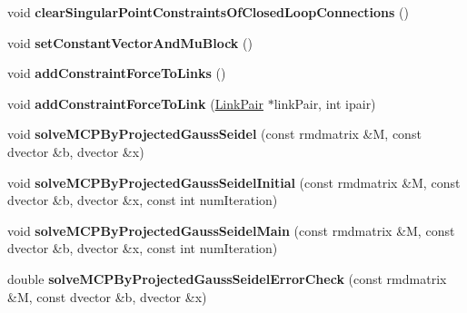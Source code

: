 \begin{DoxyCompactItemize}
\item 
\hypertarget{classOpenHRP_1_1CFSImpl_ab7dda78cbc91b0a1de4179ea4e67e830}{void {\bfseries clear\-Singular\-Point\-Constraints\-Of\-Closed\-Loop\-Connections} ()}\label{classOpenHRP_1_1CFSImpl_ab7dda78cbc91b0a1de4179ea4e67e830}

\item 
\hypertarget{classOpenHRP_1_1CFSImpl_abf1ed971249dd317097ed66dcae9b31d}{void {\bfseries set\-Constant\-Vector\-And\-Mu\-Block} ()}\label{classOpenHRP_1_1CFSImpl_abf1ed971249dd317097ed66dcae9b31d}

\item 
\hypertarget{classOpenHRP_1_1CFSImpl_af2ed56c8f5f0227f1e8afc58ac5743a7}{void {\bfseries add\-Constraint\-Force\-To\-Links} ()}\label{classOpenHRP_1_1CFSImpl_af2ed56c8f5f0227f1e8afc58ac5743a7}

\item 
\hypertarget{classOpenHRP_1_1CFSImpl_a6107cfc0cad5c21a806ca359ebae2b17}{void {\bfseries add\-Constraint\-Force\-To\-Link} (\hyperlink{structOpenHRP_1_1CFSImpl_1_1LinkPair}{Link\-Pair} $\ast$link\-Pair, int ipair)}\label{classOpenHRP_1_1CFSImpl_a6107cfc0cad5c21a806ca359ebae2b17}

\item 
\hypertarget{classOpenHRP_1_1CFSImpl_ac7c9f14d3defb03d423ecd23a0aa48a5}{void {\bfseries solve\-M\-C\-P\-By\-Projected\-Gauss\-Seidel} (const rmdmatrix \&M, const dvector \&b, dvector \&x)}\label{classOpenHRP_1_1CFSImpl_ac7c9f14d3defb03d423ecd23a0aa48a5}

\item 
\hypertarget{classOpenHRP_1_1CFSImpl_abc1fd4c183745df887bf22e093478bcf}{void {\bfseries solve\-M\-C\-P\-By\-Projected\-Gauss\-Seidel\-Initial} (const rmdmatrix \&M, const dvector \&b, dvector \&x, const int num\-Iteration)}\label{classOpenHRP_1_1CFSImpl_abc1fd4c183745df887bf22e093478bcf}

\item 
\hypertarget{classOpenHRP_1_1CFSImpl_ac0c52b69db7e7404cad20acbeb56f722}{void {\bfseries solve\-M\-C\-P\-By\-Projected\-Gauss\-Seidel\-Main} (const rmdmatrix \&M, const dvector \&b, dvector \&x, const int num\-Iteration)}\label{classOpenHRP_1_1CFSImpl_ac0c52b69db7e7404cad20acbeb56f722}

\item 
\hypertarget{classOpenHRP_1_1CFSImpl_aea49607282c5a13dbed9ab49846d3d99}{double {\bfseries solve\-M\-C\-P\-By\-Projected\-Gauss\-Seidel\-Error\-Check} (const rmdmatrix \&M, const dvector \&b, dvector \&x)}\label{classOpenHRP_1_1CFSImpl_aea49607282c5a13dbed9ab49846d3d99}


\end{DoxyCompactItemize}
